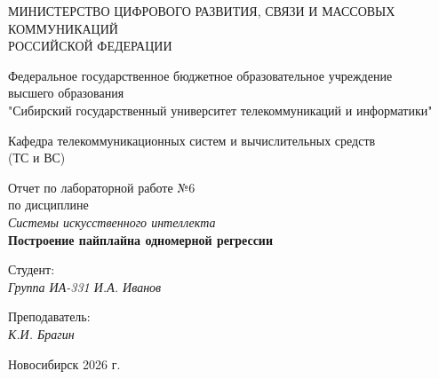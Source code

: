 \thispagestyle{empty}

\begin{center}
    МИНИСТЕРСТВО ЦИФРОВОГО РАЗВИТИЯ, СВЯЗИ И МАССОВЫХ КОММУНИКАЦИЙ \\ РОССИЙСКОЙ ФЕДЕРАЦИИ
    
    \vspace{20pt}
    
    Федеральное государственное бюджетное образовательное учреждение \\ высшего образования \\
    "Сибирский государственный университет телекоммуникаций и информатики" \\
    
    \vspace{20pt}
    
    Кафедра телекоммуникационных систем и вычислительных средств \\ (ТС и ВС)
\end{center}

\vfill

\begin{center}
    Отчет по лабораторной работе №6 \\
    по дисциплине \\
    \textit{Системы искусственного интеллекта} \\
    \vspace{10pt}
    \textbf{Построение пайплайна одномерной регрессии}
    \vspace{20pt}
\end{center}

\vfill

\noindent Студент: \\
\textit{Группа ИА-331 \hfill И.А. Иванов}

\vspace{20pt}

\noindent Преподаватель: \\
\textit{\hfill К.И. Брагин}

\vfill

\begin{center}
    Новосибирск 2026 г.
\end{center}